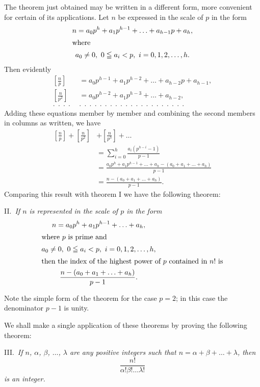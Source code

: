 \documentclass[oneside]{book}
\begin{document}
The theorem just obtained may be written in a different form, more
convenient for certain of its applications. Let $n$ be expressed in
the scale of $p$ in the form
\begin{gather*}
n = a_0p^h + a_1p^{h-1} + \ldots + a_{h-1}p + a_h, \\
\intertext{where}
a_0 \neq 0,\ 0 \leqq a_i < p,\ i = 0, 1, 2, \ldots, h.
\end{gather*}
Then evidently
\begin{align*}
\left[ \frac{n}{p} \right]   &= a_0p^{h-1} + a_1p^{h-2} + \ldots +
  a_{h-2}p + a_{h-1}, \\
\left[ \frac{n}{p^2} \right] &= a_0p^{h-2} + a_1p^{h-3} + \ldots +
  a_{h-2}, \\
.\  \ .\ \ .\ \ .\ \ &.\ \ .\ \ .\ \ .\ \ .\ \ .\ \ .\ \ .\ \ .\ \
.\ \ .\ \ .\ \ .\ \ .\ \ .\ \ .\ \ .\ \ .\ \ .\ \ .\ \ .
\end{align*}
Adding these equations member by member and combining the second
members in columns as written, we have
\begin{align*}
\left[ \frac{n}{p} \right] +
  \left[ \frac{n}{p^2} \right] &+
  \left[ \frac{n}{p^3} \right] + \ldots \\
&= \sum_{i=0}^h \frac{a_i(p^{h-i} - 1)}{p - 1} \\
&= \frac{a_0p^h + a_1p^{h-1} + \ldots + a_h -
          (a_0 + a_1 + \ldots + a_h)}{p-1} \\
&= \frac{n - (a_0 + a_1 + \ldots + a_h)}{p - 1}.
\end{align*}
Comparing this result with theorem I we have the following theorem:

\smallskip II.~\emph{If $n$ is represented in the scale of $p$ in
the form
\begin{gather*}
n = a_0 p^h + a_1 p^{h-1} + \ldots + a_h, \\
\intertext{where $p$ is prime and}
a_0 \neq 0,\ 0 \leqq a_i < p,\ i = 0, 1, 2, \ldots, h, \\
\intertext{then the index of the highest power of $p$ contained in
$n!$ is}
\frac{n - (a_0 + a_1 + \ldots + a_h)}{p - 1}.
\end{gather*}}

Note the simple form of the theorem for the case $p = 2$; in this
case the denominator $p - 1$ is unity.

We shall make a single application of these theorems by proving the
following theorem:

\smallskip III.~\emph{If $n$, $\alpha$, $\beta$, $\ldots$, $\lambda$
are any positive integers such that $n = \alpha + \beta + \ldots +
\lambda$, then
\begin{equation}
\frac{n!}{\alpha! \beta! \ldots \lambda!} \tag{A}
\end{equation}
is an integer.}
\end{document}
